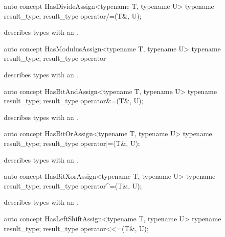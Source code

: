 \documentclass[american,twoside]{book}
\begin{document}
\begin{itemdecl}
auto concept HasDivideAssign<typename T, typename U> {
  typename result_type;
  result_type operator/=(T&, U);
}
\end{itemdecl}

\begin{itemdescr}
\pnum
\mbox{\reallynote} describes types with an \mbox{}.
\end{itemdescr}

\begin{itemdecl}
auto concept HasModulusAssign<typename T, typename U> {
  typename result_type;
  result_type operator%
}
\end{itemdecl}

\begin{itemdescr}
\pnum
\mbox{\reallynote} describes types with an \mbox{}.
\end{itemdescr}

\begin{itemdecl}
auto concept HasBitAndAssign<typename T, typename U> {
  typename result_type;
  result_type operator&=(T&, U);
}
\end{itemdecl}

\begin{itemdescr}
\pnum
\mbox{\reallynote} describes types with an \mbox{}.
\end{itemdescr}

\begin{itemdecl}
auto concept HasBitOrAssign<typename T, typename U> {
  typename result_type;
  result_type operator|=(T&, U);
}
\end{itemdecl}

\begin{itemdescr}
\pnum
\mbox{\reallynote} describes types with an \mbox{}.
\end{itemdescr}

\begin{itemdecl}
auto concept HasBitXorAssign<typename T, typename U> {
  typename result_type;
  result_type operator^=(T&, U);
}
\end{itemdecl}

\begin{itemdescr}
\pnum
\mbox{\reallynote} describes types with an \mbox{}.
\end{itemdescr}

\begin{itemdecl}
auto concept HasLeftShiftAssign<typename T, typename U> {
  typename result_type;
  result_type operator<<=(T&, U);
}
\end{itemdecl}
\end{document}
